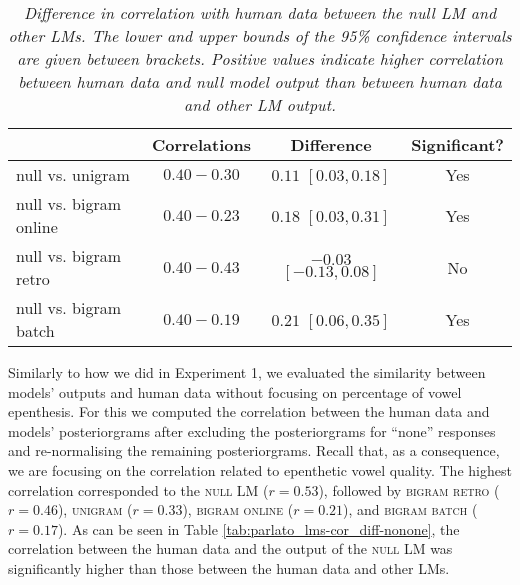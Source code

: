 {%
\begin{table}[ht]
\centering
\caption{\textit{Difference in correlation with human data between the null LM and other LMs. The lower and upper bounds of the 95\% confidence intervals are given between brackets. Positive values indicate higher correlation between human data and null model output than between human data and other LM output.}}
\label{tab:parlato_lms-cor_diff}
\vspace{0.25cm}
\begin{tabular}{lccc}
   \toprule
  & Correlations & Difference & Significant? \\  \midrule
null vs. unigram & $0.40 - 0.30$ & $0.11$ $[0.03, 0.18]$ &  Yes \\ 
null vs. bigram online  & $0.40 - 0.23$ & $0.18$ $[0.03, 0.31]$ &  Yes \\ 
null vs. bigram retro & $0.40 - 0.43$ & $-0.03$ $[-0.13, 0.08]$ &  No \\ 
null vs. bigram batch & $0.40 - 0.19$ & $0.21$ $[0.06, 0.35]$ & Yes \\  \bottomrule 
\end{tabular}
\end{table}

Similarly to how we did in Experiment 1, we evaluated the similarity between models' outputs and human data without focusing on percentage of vowel epenthesis. For this we computed the correlation between the human data and models' posteriorgrams after excluding the posteriorgrams for ``none'' responses and re-normalising the remaining posteriorgrams. Recall that, as a consequence, we are focusing on the correlation related to epenthetic vowel quality. The highest correlation corresponded to the \textsc{null} LM ($r = 0.53$), followed by \textsc{bigram retro} ($r = 0.46$), \textsc{unigram} ($r = 0.33$), \textsc{bigram online} ($r = 0.21$), and \textsc{bigram batch} ($r = 0.17$). 
As can be seen in Table \ref{tab:parlato_lms-cor_diff-nonone}, the correlation between the human data and the output of the \textsc{null} LM was significantly higher than those between the human data and other LMs. 

}
